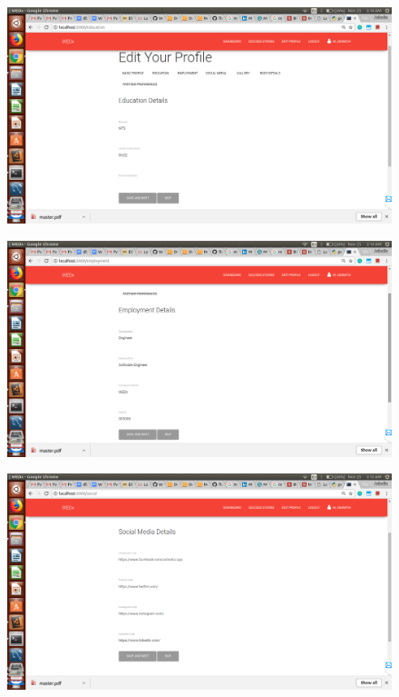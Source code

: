 \documentclass[12pt]{report}
\begin{document}
\begin{figure}[!htb]
    \centering
    \includegraphics[width=1\textwidth]{sc-3.png}
\end{figure}

\begin{figure}[!htb]
    \centering
    \includegraphics[width=1\textwidth]{sc-4.png}
\end{figure}

\begin{figure}[!htb]
    \centering
    \includegraphics[width=1\textwidth]{sc-5.png}
\end{figure}
\end{document}
